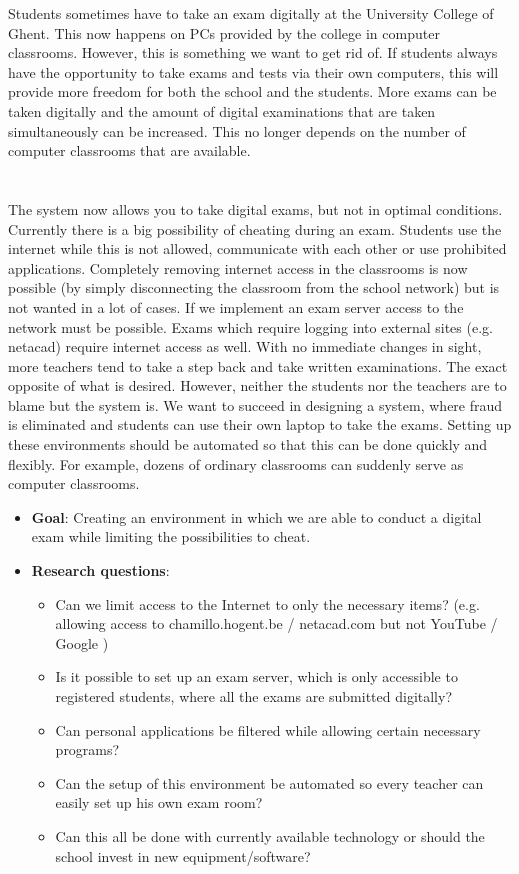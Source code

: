 \documentclass[fleqn,10pt]{voorstel}
\begin{document}
Students sometimes have to take an exam digitally at the University College of Ghent. This now happens on PCs provided by the college in computer classrooms. However, this is something we want to get rid of. If students always have the opportunity to take exams and tests via their own computers, this will provide more freedom for both the school and the students. More exams can be taken digitally and the amount of digital examinations that are taken simultaneously can be increased. This no longer depends on the number of computer classrooms that are available.\\
\\
\\
The system now allows you to take digital exams, but not in optimal conditions. Currently there is a big possibility of cheating during an exam. Students use the internet while this is not allowed, communicate with each other or use prohibited applications. Completely removing internet access in the classrooms is now possible (by simply disconnecting the classroom from the school network) but is not wanted in a lot of cases. If we implement an exam server access to the network must be possible. Exams which require logging  into external sites (e.g. netacad) require internet access as well.  With no immediate changes in sight, more teachers tend to take a step back and take written examinations. The exact opposite of what is desired. However, neither the students nor the teachers are to blame but the system is. We want to succeed in designing a system, where fraud is eliminated and students can use their own laptop to take the exams. Setting up these environments should be automated so that this can be done quickly and flexibly. For example, dozens of ordinary classrooms can suddenly serve as computer classrooms. \\
\begin{itemize}
  \item \textbf{Goal}: Creating an environment in which we are able to conduct a digital exam while limiting the possibilities to cheat.
  \item \textbf{Research questions}:
\begin{itemize}
   \item Can we limit access to the Internet to only the necessary items? (e.g. allowing access to chamillo.hogent.be / netacad.com but not YouTube / Google )
   \item Is it possible to set up an exam server, which is only accessible to registered students, where all the exams are submitted digitally?
   \item Can personal applications be filtered while allowing certain necessary programs?
   \item Can the setup of this environment be automated so every teacher can easily set up his own exam room?
   \item Can this all be done with currently available technology or should the school invest in new equipment/software?
  \end{itemize}
\end{itemize}
\end{document}

